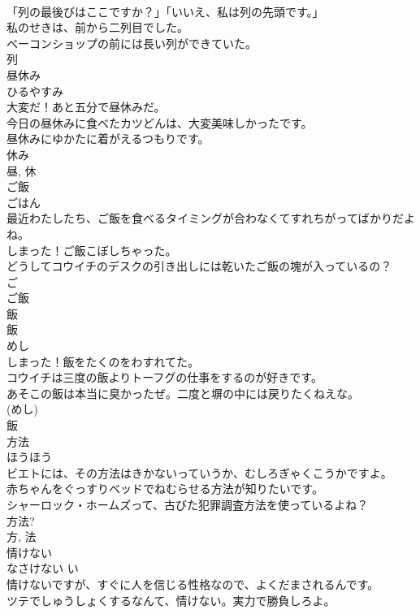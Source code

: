 \documentclass[8pt]{extreport}
\begin{document}
\begin{CJK}{UTF8}{min}
\\	「列の最後びはここですか？」「いいえ、私は列の先頭です。」	
\\	私のせきは、前から二列目でした。	
\\	ベーコンショップの前には長い列ができていた。	
\\	列	
\\	昼休み	
\\	ひるやすみ	
\\	大変だ！あと五分で昼休みだ。	
\\	今日の昼休みに食べたカツどんは、大変美味しかったです。	
\\	昼休みにゆかたに着がえるつもりです。	
\\	休み 
\\	昼, 休	
\\	ご飯	
\\	ごはん	
\\	最近わたしたち、ご飯を食べるタイミングが合わなくてすれちがってばかりだよね。	
\\	しまった！ご飯こぼしちゃった。	
\\	どうしてコウイチのデスクの引き出しには乾いたご飯の塊が入っているの？	
\\	ご 
\\	ご飯
\\	飯	
\\	飯	
\\	めし	
\\	しまった！飯をたくのをわすれてた。	
\\	コウイチは三度の飯よりトーフグの仕事をするのが好きです。	
\\	あそこの飯は本当に臭かったぜ。二度と塀の中には戻りたくねえな。	
\\	(めし) 
\\	飯	
\\	方法	
\\	ほうほう	
\\	ビエトには、その方法はきかないっていうか、むしろぎゃくこうかですよ。	
\\	赤ちゃんをぐっすりベッドでねむらせる方法が知りたいです。	
\\	シャーロック・ホームズって、古びた犯罪調査方法を使っているよね？	
\\	方法? 
\\	方, 法	
\\	情けない	
\\	なさけない	い 
\\	情けないですが、すぐに人を信じる性格なので、よくだまされるんです。	
\\	ツテでしゅうしょくするなんて、情けない。実力で勝負しろよ。	

\end{CJK}
\end{document}
